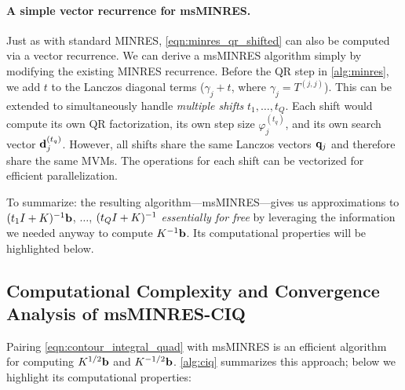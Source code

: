 

\paragraph{A simple vector recurrence for msMINRES.}
Just as with standard MINRES, \cref{eqn:minres_qr_shifted} can also be computed via a vector recurrence.
We can derive a msMINRES algorithm simply by modifying the existing MINRES recurrence.
Before the QR step in \cref{alg:minres}, we add $t$ to the Lanczos diagonal terms ($\gamma_j + t$, where $\gamma_j = T^{(j,j)}$).
This can be extended to simultaneously handle \emph{multiple shifts} $t_1, \ldots, t_Q$.
Each shift would compute its own QR factorization, its own step size $\varphi_j^{(t_q)}$, and its own search vector $\mathbf{d}_j^{(t_q)}$.
However, all shifts share the same Lanczos vectors $\mathbf{q}_j$ and therefore share the same MVMs.
The operations for each shift can be vectorized for efficient parallelization.

To summarize: the resulting algorithm---msMINRES---gives us approximations to $(t_1 I + K)^{-1} \mathbf{b}$, $\ldots$, $(t_Q I + K)^{-1}$ \emph{essentially for free} by leveraging the information we needed anyway to compute $K^{-1} \mathbf{b}$.
Its computational properties will be highlighted below.




\subsection{Computational Complexity and Convergence Analysis of msMINRES-CIQ}
Pairing \cref{eqn:contour_integral_quad} with msMINRES is an efficient algorithm for computing $K^{1/2} \mathbf{b}$ and $K^{-1/2} \mathbf{b}$.
\cref{alg:ciq} summarizes this approach; below we highlight its computational properties:

\label{sec:convergence}

